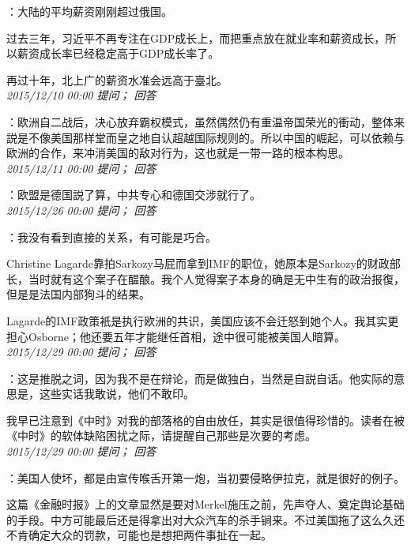 \documentclass[twocolumn]{ctexart}
\begin{document}
：大陆的平均薪资刚刚超过俄国。

过去三年，习近平不再专注在GDP成长上，而把重点放在就业率和薪资成长，所以薪资成长率已经稳定高于GDP成长率了。

再过十年，北上广的薪资水准会远高于臺北。\\

\textit{\hfill\noindent\small 2015/12/10 00:00 提问； 回答}

：欧洲自二战后，决心放弃霸权模式，虽然偶然仍有重温帝国荣光的衝动，整体来説是不像美国那样堂而皇之地自认超越国际规则的。所以中国的崛起，可以依赖与欧洲的合作，来冲消美国的敌对行为，这也就是一带一路的根本构思。\\

\textit{\hfill\noindent\small 2015/12/11 00:00 提问； 回答}

：欧盟是德国説了算，中共专心和德国交涉就行了。\\

\textit{\hfill\noindent\small 2015/12/26 00:00 提问； 回答}

：我没有看到直接的关系，有可能是巧合。

Christine Lagarde靠拍Sarkozy马屁而拿到IMF的职位，她原本是Sarkozy的财政部长，当时就有这个案子在醖酿。我个人觉得案子本身的确是无中生有的政治报復，但是是法国内部狗斗的结果。

Lagarde的IMF政策衹是执行欧洲的共识，美国应该不会迁怒到她个人。我其实更担心Osborne；他还要五年才能继任首相，途中很可能被美国人暗算。\\

\textit{\hfill\noindent\small 2015/12/29 00:00 提问； 回答}

：这是推脱之词，因为我不是在辩论，而是做独白，当然是自説自话。他实际的意思是，这些实话我敢说，他们不敢印。

我早已注意到《中时》对我的部落格的自由放任，其实是很值得珍惜的。读者在被《中时》的软体缺陷困扰之际，请提醒自己那些是次要的考虑。\\

\textit{\hfill\noindent\small 2015/12/29 00:00 提问； 回答}

：美国人使坏，都是由宣传喉舌开第一炮，当初要侵略伊拉克，就是很好的例子。

这篇《金融时报》上的文章显然是要对Merkel施压之前，先声夺人、奠定舆论基础的手段。中方可能最后还是得拿出对大众汽车的杀手锏来。不过美国拖了这么久还不肯确定大众的罚款，可能也是想把两件事扯在一起。\\
\end{document}
